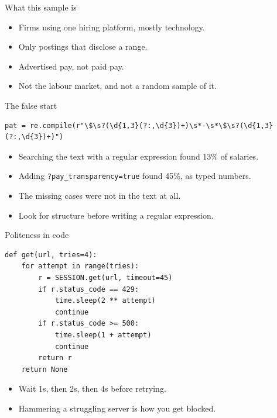 \documentclass[11pt,aspectratio=169]{beamer}
\newenvironment{wideitemize}
  {\begin{itemize}\setlength{\itemsep}{10pt}}
  {\end{itemize}}
\begin{document}
\begin{frame}{What this sample is}
\begin{wideitemize}
  \item Firms using one hiring platform, mostly technology.
  \item Only postings that disclose a range.
  \item Advertised pay, not paid pay.
  \item Not the labour market, and not a random sample of it.
\end{wideitemize}
\end{frame}

\begin{frame}[fragile]{The false start}
\begin{lstlisting}[style=py]
pat = re.compile(r"\$\s?(\d{1,3}(?:,\d{3})+)\s*-\s*\$\s?(\d{1,3}(?:,\d{3})+)")
\end{lstlisting}

\begin{wideitemize}
  \item Searching the text with a regular expression found 13\% of salaries.
  \item Adding \texttt{?pay\_transparency=true} found 45\%, as typed numbers.
  \item The missing cases were not in the text at all.
  \item Look for structure before writing a regular expression.
\end{wideitemize}
\end{frame}

\begin{frame}[fragile]{Politeness in code}
\begin{lstlisting}[style=py]
def get(url, tries=4):
    for attempt in range(tries):
        r = SESSION.get(url, timeout=45)
        if r.status_code == 429:
            time.sleep(2 ** attempt)
            continue
        if r.status_code >= 500:
            time.sleep(1 + attempt)
            continue
        return r
    return None
\end{lstlisting}

\begin{wideitemize}
  \item Wait 1s, then 2s, then 4s before retrying.
  \item Hammering a struggling server is how you get blocked.
\end{wideitemize}
\end{frame}
\end{document}
